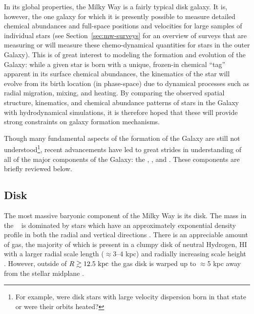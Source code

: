 In its global properties, the Milky Way is a fairly typical disk galaxy. It is,
however, the one galaxy for which it is presently possible to measure detailed
chemical abundances and full-space positions and velocities for large samples of
individual stars (see Section~\ref{sec:mw-surveys} for an overview of surveys
that are measuring or will measure these chemo-dynamical quantities for stars in
the outer Galaxy). This is of great interest to modeling the formation and
evolution of the Galaxy: while a given star is born with a unique, frozen-in
chemical ``tag'' apparent in its surface chemical abundances, the kinematics of
the star will evolve from its birth location (in phase-space) due to dynamical
processes such as radial migration, mixing, and heating. By comparing the
observed spatial structure, kinematics, and chemical abundance patterns of stars
in the Galaxy with hydrodynamical simulations, it is therefore hoped that these
will provide strong constraints on galaxy formation mechanisms.

Though many fundamental aspects of the formation of the Galaxy are still not
understood\footnote{For example, were disk stars with large velocity dispersion
born in that state or were their orbits heated?}, recent advancements have led
to great strides in understanding of all of the major components of the Galaxy:
the \mwdisk, \mwbulge, and \mwhalo. These components are briefly reviewed below.

\subsection{Disk}

The most massive baryonic component of the Milky Way is its disk. The mass in
the \mwdisk\ \citep[$M_d \approx 5 \times 10^{10}~\msun$;][]{mcmillan11} is
dominated by stars which have an approximately exponential density profile in
both the radial and vertical directions \citep[with scale lengths of $\approx$2
--3 kpc and $\approx$250--800 pc, respectively, from thin to thick
disk;][]{ojha01, juric08, mcmillan11, bovy12-spatialMAP}. There is an
appreciable amount of gas, the majority of which is present in a clumpy disk of
neutral Hydrogen, HI \citep[$M_{\rm HI} \approx 8 \times
10^9~\msun$;][]{kalberla09} with a larger radial scale length ($\approx$3--4
kpc) and radially increasing scale height \citep[$\approx$100 pc at $R=8~\kpc$
to $\approx$1 kpc at $R=25~\kpc$;][]{wouterloot90, merrifield92}. However,
outside of $R \gtrsim 12.5~\mathrm{kpc}$ the gas disk is warped up to $\approx$5 kpc
away from the stellar midplane \citep{henderson82, kalberla07}.

